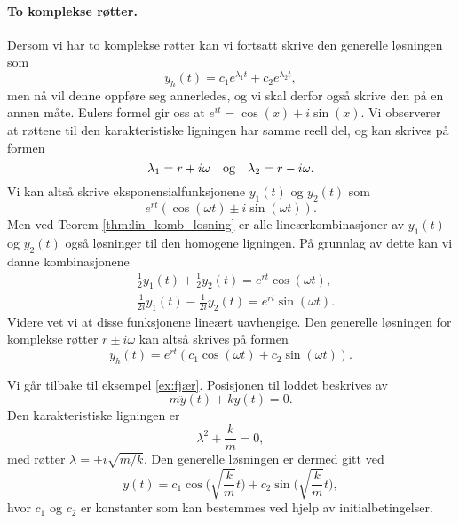 \documentclass{article}
\theoremstyle{definition}
\newenvironment{ex}
{\pushQED{\qed}\renewcommand{\qedsymbol}{$\triangle$}\exx}
{\popQED\endexx}
\theoremstyle{remark}
\begin{document}
\begin{multicols*}{2}
\paragraph*{To komplekse røtter.} Dersom vi har to komplekse røtter kan vi fortsatt skrive den generelle løsningen som
\begin{equation*}
  y_h(t) = c_1 e^{\lambda_1 t} + c_2 e^{\lambda_2 t},
\end{equation*}
men nå vil denne oppføre seg annerledes, og vi skal derfor også skrive den på en annen måte. Eulers formel gir oss at $e^{i t} = \cos(x) + i \sin(x)$. Vi observerer at røttene til den karakteristiske ligningen har samme reell del, og kan skrives på formen
\begin{equation*}
  \lambda_1 = r + i \omega \ \ \textnormal{ og }\ \ \lambda_2 = r - i \omega.
\end{equation*}
Vi kan altså skrive eksponensialfunksjonene $y_1(t)$ og $y_2(t)$ som
\begin{equation*}
  e^{rt} (\cos(\omega t) \pm i \sin(\omega t)).
\end{equation*}
Men ved Teorem \ref{thm:lin_komb_losning} er alle lineærkombinasjoner av $y_1(t)$ og $y_2(t)$ også løsninger til den homogene ligningen. På grunnlag av dette kan vi danne kombinasjonene 
\begin{equation*}
  \begin{split}
    & \frac{1}{2}y_1(t) + \frac{1}{2} y_2(t) = e^{r t} \cos(\omega t), \\
    & \frac{1}{2i}y_1(t) - \frac{1}{2i} y_2(t) = e^{r t} \sin(\omega t).
  \end{split}
\end{equation*}
Videre vet vi at disse funksjonene
lineært uavhengige. Den generelle løsningen for komplekse røtter $r \pm i \omega$ kan altså skrives på formen
\begin{equation*}
  y_h(t) = e^{r t} (c_1 \cos(\omega t) + c_2 \sin(\omega t)).
\end{equation*}

\begin{ex}
  Vi går tilbake til eksempel \ref{ex:fjær}. Posisjonen til loddet beskrives av
  \begin{equation*}
    m \ddot{y}(t) + ky(t) = 0.
  \end{equation*}
  Den karakteristiske ligningen er
  \begin{equation*}
    \lambda^2 + \frac{k}{m} = 0,
  \end{equation*}
  med røtter $\lambda = \pm i \sqrt{m / k}$. Den generelle løsningen er dermed gitt ved
  \begin{equation*}
    y(t) = c_1 \cos\bigg(\sqrt{\frac{k}{m}} t\bigg) + c_2 \sin\bigg(\sqrt{\frac{k}{m}} t\bigg),
  \end{equation*}
  hvor $c_1$ og $c_2$ er konstanter som kan bestemmes ved hjelp av initialbetingelser.
\end{ex}


\end{multicols*}
\end{document}
